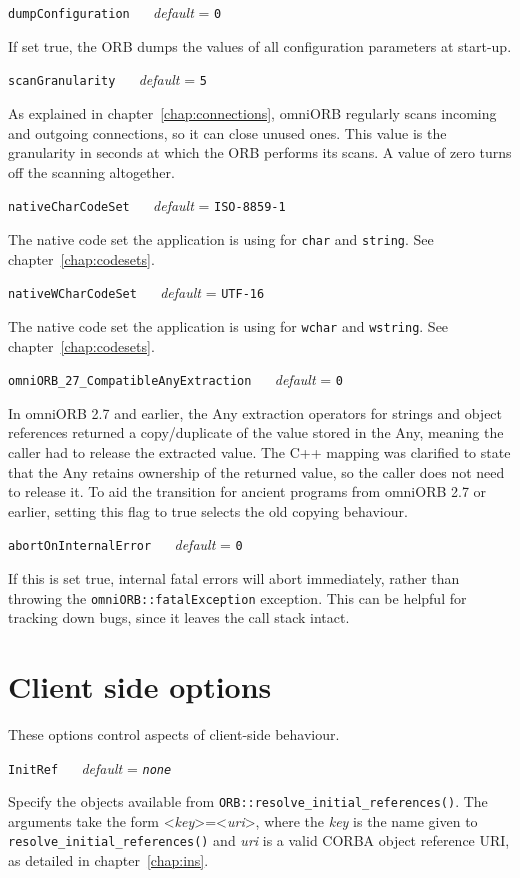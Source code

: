 \documentclass[11pt,twoside,a4paper]{book}
\makeatletter
\newcommand{\type}[1]{\texttt{#1}}
\newcommand{\code}[1]{\texttt{#1}}
\newcommand{\op}[1]{\texttt{#1()}}
\newcommand{\confopt}[2]
  {\vspace{\baselineskip}\par\noindent\code{#1} ~~ \textit{default} =
   \code{#2}\\[-1ex]\@afterheading}
\newcommand{\dsc}{\discretionary{}{}{}}
\makeatother
\begin{document}
\confopt{dumpConfiguration}{0}

If set true, the ORB dumps the values of all configuration parameters
at start-up.


\confopt{scanGranularity}{5}

As explained in chapter~\ref{chap:connections}, omniORB regularly
scans incoming and outgoing connections, so it can close unused
ones. This value is the granularity in seconds at which the ORB
performs its scans. A value of zero turns off the scanning altogether.


\confopt{nativeCharCodeSet}{ISO-8859-1}

The native code set the application is using for \type{char} and
\type{string}. See chapter~\ref{chap:codesets}.


\confopt{nativeWCharCodeSet}{UTF-16}

The native code set the application is using for \type{wchar} and
\type{wstring}. See chapter~\ref{chap:codesets}.


\confopt{omniORB\_27\_CompatibleAnyExtraction}{0}

In omniORB 2.7 and earlier, the Any extraction operators for strings
and object references returned a copy/duplicate of the value stored in
the Any, meaning the caller had to release the extracted value. The
C++ mapping was clarified to state that the Any retains ownership of
the returned value, so the caller does not need to release it. To aid
the transition for ancient programs from omniORB 2.7 or earlier,
setting this flag to true selects the old copying behaviour.


\confopt{abortOnInternalError}{0}

If this is set true, internal fatal errors will abort immediately,
rather than throwing the \type{omniORB::fatalException} exception.
This can be helpful for tracking down bugs, since it leaves the call
stack intact.


\section{Client side options}

These options control aspects of client-side behaviour.


\confopt{InitRef}{\textit{none}}

Specify the objects available from
\op{ORB::resolve\_initial\_references}. The arguments take the form
<\textit{key}>=<\textit{uri}>, where the \textit{key} is the name
given to \op{resolve\_\dsc{}initial\_\dsc{}references} and
\textit{uri} is a valid CORBA object reference URI, as detailed in
chapter~\ref{chap:ins}.
\end{document}
